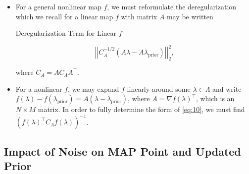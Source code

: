 \documentclass[11pt]{beamer}
\begin{document}
\begin{frame}

\begin{itemize}
	
	\item For a general nonlinear map $f$, we must reformulate the deregularization which we recall for a linear map $f$ with matrix $A$ may be written

\begin{block}{Deregularization Term for Linear $f$}

\begin{equation} \label{eq:10}
\left|\left|C_A^{-1/2}(A\lambda-A\lambda_{\text{prior}})\right|\right|_2^2,
\end{equation} 

\noindent where $C_A=AC_\Lambda A^\top$. 

\end{block}

\item For a nonlinear $f$, we may expand $f$ linearly around some $\lambda \in \Lambda$ and write $f(\lambda)-f(\lambda_\text{prior})=A (\lambda-\lambda_\text{prior})$, where $A=\nabla f (\lambda)^\top$, which is an $N \times M$ matrix. In order to fully determine the form of \eqref{eq:10}, we must find $(f(\lambda)^\top C_\Lambda f(\lambda))^{-1}$.


\end{itemize}

\end{frame}

\subsection{Impact of Noise on MAP Point and Updated Prior}
\end{document}
